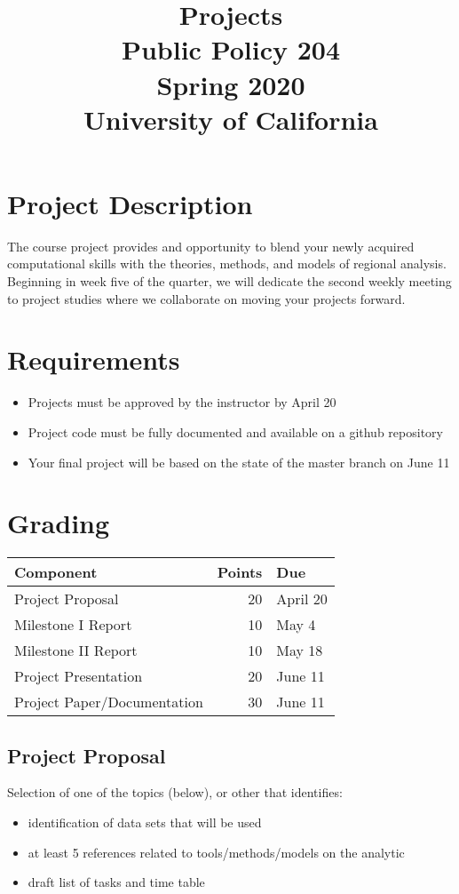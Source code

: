 \documentclass[12pt]{article}
\date{}
\title{Projects\\\medskip
\large Public Policy 204 \\ Spring 2020 \\ University of California}
\begin{document}
\maketitle

\section*{Project Description}
\label{sec:org9d605c3}
The course project provides and opportunity to blend your newly acquired
computational skills with the theories, methods, and models of regional
analysis. Beginning in week five of the quarter, we will dedicate the second
weekly meeting to project studies where we collaborate on moving your projects
forward.
\section*{Requirements}
\label{sec:org520744c}
\begin{itemize}
\item Projects must be approved by the instructor by April 20
\item Project code must be fully documented and available on a github repository
\item Your final project will be based on the state of the master branch on June 11
\end{itemize}
\section*{Grading}
\label{sec:orgeed2e14}

\begin{center}
\begin{tabular}{lrl}
Component & Points & Due\\
\hline
Project Proposal & 20 & April 20\\
Milestone I Report & 10 & May 4\\
Milestone II Report & 10 & May 18\\
Project Presentation & 20 & June 11\\
Project Paper/Documentation & 30 & June 11\\
\hline
\end{tabular}
\end{center}
\subsection*{Project Proposal}
\label{sec:org0feb74d}
Selection of one of the topics (below), or other that identifies:
\begin{itemize}
\item identification of data sets that will be used
\item at least 5 references related to tools/methods/models on the analytic
\item draft list of tasks and time table
\end{itemize}
\end{document}
